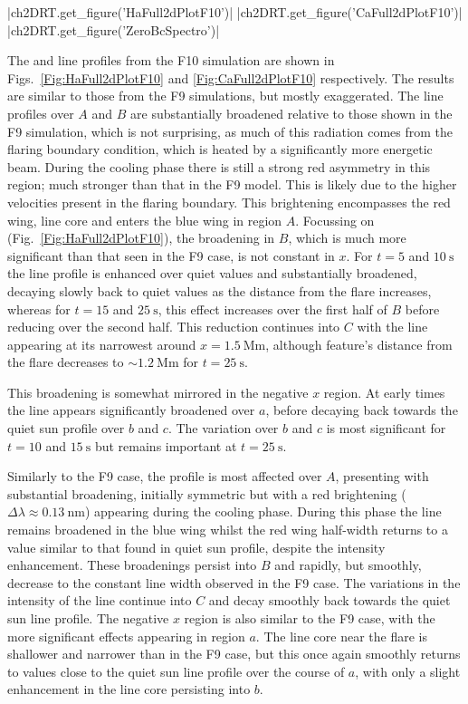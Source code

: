 \py[2DRT]|ch2DRT.get_figure('HaFull2dPlotF10')|
\py[2DRT]|ch2DRT.get_figure('CaFull2dPlotF10')|
\py[2DRT]|ch2DRT.get_figure('ZeroBcSpectro')|

The \Ha{} and \CaLine{} line profiles from the F10 simulation are shown in Figs.~\ref{Fig:HaFull2dPlotF10} and \ref{Fig:CaFull2dPlotF10} respectively.
The results are similar to those from the F9 simulations, but mostly exaggerated.
The line profiles over $A$ and $B$ are substantially broadened relative to those shown in the F9 simulation, which is not surprising, as much of this radiation comes from the flaring boundary condition, which is heated by a significantly more energetic beam.
During the cooling phase there is still a strong red asymmetry in this region; much stronger than that in the F9 model.
This is likely due to the higher velocities present in the flaring boundary.
This brightening encompasses the red wing, line core and enters the blue wing in region $A$.
Focussing on \Ha{} (Fig.~\ref{Fig:HaFull2dPlotF10}), the broadening in $B$, which is much more significant than that seen in the F9 case, is not constant in $x$.
For $t=5$ and $\SI{10}{\second}$ the line profile is enhanced over quiet values and substantially broadened, decaying slowly back to quiet values as the distance from the flare increases, whereas for $t=15$ and $\SI{25}{\second}$, this effect increases over the first half of $B$ before reducing over the second half.
This reduction continues into $C$ with the line appearing at its narrowest around $x=\SI{1.5}{\mega\metre}$, although feature's distance from the flare decreases to $\sim\SI{1.2}{\mega\metre}$ for $t=\SI{25}{\second}$.

This broadening is somewhat mirrored in the negative $x$ region.
At early times the line appears significantly broadened over $a$, before decaying back towards the quiet sun profile over $b$ and $c$.
The variation over $b$ and $c$ is most significant for $t=10$ and $\SI{15}{\second}$ but remains important at $t=\SI{25}{\second}$.

Similarly to the F9 case, the \CaLine{} profile is most affected over $A$, presenting with substantial broadening, initially symmetric but with a red brightening ($\Delta\lambda\approx\SI{0.13}{\nano\metre}$) appearing during the cooling phase.
During this phase the line remains broadened in the blue wing whilst the red wing half-width returns to a value similar to that found in quiet sun profile, despite the intensity enhancement.
These broadenings persist into $B$ and rapidly, but smoothly, decrease to the constant line width observed in the F9 case.
The variations in the intensity of the line continue into $C$ and decay smoothly back towards the quiet sun line profile.
The negative $x$ region is also similar to the F9 case, with the more significant effects appearing in region $a$.
The line core near the flare is shallower and narrower than in the F9 case, but this once again smoothly returns to values close to the quiet sun line profile over the course of $a$, with only a slight enhancement in the line core persisting into $b$.

